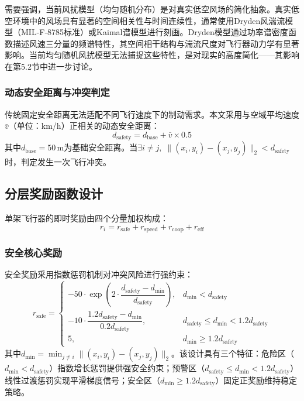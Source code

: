 \documentclass[12pt,a4paper,UTF8]{ctexart}
\begin{document}
需要强调，当前风扰模型（均匀随机分布）是对真实低空风场的简化抽象。真实低空环境中的风场具有显著的空间相关性与时间连续性，通常使用Dryden风湍流模型（MIL-F-8785标准）或Kaimal谱模型进行刻画。Dryden模型通过功率谱密度函数描述风速三分量的频谱特性，其空间相干结构与湍流尺度对飞行器动力学有显著影响\cite{ref20}。当前均匀随机风扰模型无法捕捉这些特性，是对现实的高度简化——其影响在第5.2节中进一步讨论。

\subsubsection{动态安全距离与冲突判定}

传统固定安全距离无法适配不同飞行速度下的制动需求\cite{ref7}。本文采用与空域平均速度$\bar{v}$（单位：km/h）正相关的动态安全距离：
\begin{equation}
    d_{\text{safety}} = d_{\text{base}} + \bar{v} \times 0.5
    \label{eq:dynamicsafety}
\end{equation}
其中$d_{\text{base}} = 50\,\text{m}$为基础安全距离。当$\exists i \neq j,\; \|(x_i, y_i) - (x_j, y_j)\|_2 < d_{\text{safety}}$时，判定发生一次飞行冲突。

\subsection{分层奖励函数设计}

单架飞行器的即时奖励由四个分量加权构成：
\begin{equation}
    r_i = r_{\text{safe}} + r_{\text{speed}} + r_{\text{coop}} + r_{\text{eff}}
    \label{eq:total_reward}
\end{equation}

\subsubsection{安全核心奖励}

安全奖励采用指数惩罚机制对冲突风险进行强约束：
\begin{equation}
    r_{\text{safe}} =
    \begin{cases}
        -50 \cdot \exp\left(2 \cdot \dfrac{d_{\text{safety}} - d_{\min}}{d_{\text{safety}}}\right), & d_{\min} < d_{\text{safety}} \\[10pt]
        -10 \cdot \dfrac{1.2d_{\text{safety}} - d_{\min}}{0.2d_{\text{safety}}}, & d_{\text{safety}} \leq d_{\min} < 1.2d_{\text{safety}} \\[10pt]
        5, & d_{\min} \geq 1.2d_{\text{safety}}
    \end{cases}
    \label{eq:rsafe}
\end{equation}
其中$d_{\min} = \min_{j \neq i} \|(x_i, y_i) - (x_j, y_j)\|_2$。该设计具有三个特征：危险区（$d_{\min} < d_{\text{safety}}$）指数增长惩罚提供强安全约束；预警区（$d_{\text{safety}} \leq d_{\min} < 1.2d_{\text{safety}}$）线性过渡惩罚实现平滑梯度信号；安全区（$d_{\min} \geq 1.2d_{\text{safety}}$）固定正奖励维持稳定策略。
\end{document}
